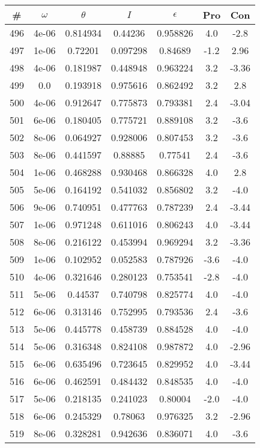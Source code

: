 \begin{table}
\begin{tabular}{c|c|c|c|c|c|c}
\# & $\omega$ & $\theta$ & $I$ & $\epsilon$ & Pro & Con\\
\hline
496 & 4e-06 & 0.814934 & 0.44236 & 0.958826 & 4.0 & -2.8\\
497 & 1e-06 & 0.72201 & 0.097298 & 0.84689 & -1.2 & 2.96\\
498 & 4e-06 & 0.181987 & 0.448948 & 0.963224 & 3.2 & -3.36\\
499 & 0.0 & 0.193918 & 0.975616 & 0.862492 & 3.2 & 2.8\\
500 & 4e-06 & 0.912647 & 0.775873 & 0.793381 & 2.4 & -3.04\\
501 & 6e-06 & 0.180405 & 0.775721 & 0.889108 & 3.2 & -3.6\\
502 & 8e-06 & 0.064927 & 0.928006 & 0.807453 & 3.2 & -3.6\\
503 & 8e-06 & 0.441597 & 0.88885 & 0.77541 & 2.4 & -3.6\\
504 & 1e-06 & 0.468288 & 0.930468 & 0.866328 & 4.0 & 2.8\\
505 & 5e-06 & 0.164192 & 0.541032 & 0.856802 & 3.2 & -4.0\\
506 & 9e-06 & 0.740951 & 0.477763 & 0.787239 & 2.4 & -3.44\\
507 & 1e-06 & 0.971248 & 0.611016 & 0.806243 & 4.0 & -3.44\\
508 & 8e-06 & 0.216122 & 0.453994 & 0.969294 & 3.2 & -3.36\\
509 & 1e-06 & 0.102952 & 0.052583 & 0.787926 & -3.6 & -4.0\\
510 & 4e-06 & 0.321646 & 0.280123 & 0.753541 & -2.8 & -4.0\\
511 & 5e-06 & 0.44537 & 0.740798 & 0.825774 & 4.0 & -4.0\\
512 & 6e-06 & 0.313146 & 0.752995 & 0.793536 & 2.4 & -3.6\\
513 & 5e-06 & 0.445778 & 0.458739 & 0.884528 & 4.0 & -4.0\\
514 & 5e-06 & 0.316348 & 0.824108 & 0.987872 & 4.0 & -2.96\\
515 & 6e-06 & 0.635496 & 0.723645 & 0.829952 & 4.0 & -3.44\\
516 & 6e-06 & 0.462591 & 0.484432 & 0.848535 & 4.0 & -4.0\\
517 & 5e-06 & 0.218135 & 0.241023 & 0.80004 & -2.0 & -4.0\\
518 & 6e-06 & 0.245329 & 0.78063 & 0.976325 & 3.2 & -2.96\\
519 & 8e-06 & 0.328281 & 0.942636 & 0.836071 & 4.0 & -3.6\\

\end{tabular}
\end{table}
